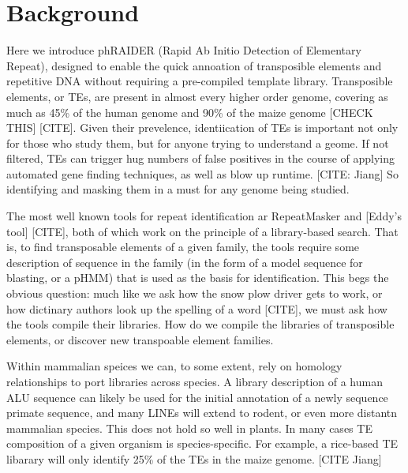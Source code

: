 \documentclass{bmcart}
\begin{document}
\section*{Background}
Here we introduce phRAIDER (Rapid Ab Initio Detection of Elementary
Repeat), designed to enable the quick annoation of transposible
elements and repetitive DNA without requiring a pre-compiled template
library.  Transposible elements, or TEs, are present in almost every
higher order genome, covering as much as 45\% of the human genome and
90\% of the maize genome [CHECK THIS] [CITE].  Given their prevelence,
identiication of TEs is important not only for those who study them, but for
anyone trying to understand a geome.  If not filtered, TEs can trigger
hug numbers of false positives in the course of applying automated
gene finding techniques, as well as blow up runtime.  [CITE: Jiang]
So identifying and masking them in a must for any genome being
studied.

The most well known tools for repeat identification ar RepeatMasker
and [Eddy's tool] [CITE], both of which work on the principle of a
library-based search.  That is, to find transposable elements of a
given family, the tools require some description of sequence in the
family (in the form of a model sequence for blasting, or a pHMM) that
is used as the basis for identification.  This begs the obvious
question: much like we ask how the snow plow driver gets to work, or
how dictinary authors look up the spelling of a word [CITE], we must ask how the
tools compile their libraries.  How do we compile the libraries of
transposible elements, or discover new transpoable element families.

Within mammalian speices we can, to some extent, rely on homology
relationships to port libraries across species.  A library description
of a human ALU sequence can likely be used for the initial annotation
of a newly sequence primate sequence, and many LINEs will extend to
rodent, or even more distantn mammalian species.  This does not hold
so well in plants.  In many cases TE composition of a given organism
is species-specific.  For example, a rice-based TE libarary will only identify 25\%
of the TEs in the maize genome. [CITE Jiang] 
\end{document}
